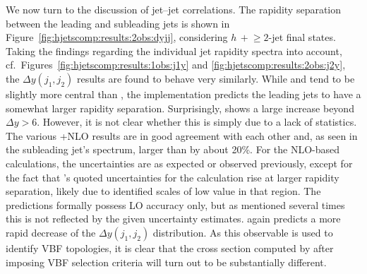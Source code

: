 We now turn to the discussion of jet--jet correlations.
The rapidity separation between the leading and subleading jets is
shown in Figure~\ref{fig:hjetscomp:results:2obs:dyjj}, considering
$h\,+\!\ge\!2$-jet final states. Taking the findings regarding the
individual jet rapidity spectra into account,
cf.~Figures~\ref{fig:hjetscomp:results:1obs:j1y} and
\ref{fig:hjetscomp:results:2obs:j2y}, the $\Delta y(j_1,j_2)$ results
are found to behave very similarly. While \hjetscompSherpa \hjetscompNNLOPS and \hjetscompMGaMC
tend to be slightly more central than \hjetscompPowheg, the \hjetscompSherpa \hjetscompMEPSatNLO
implementation predicts the leading jets to have a somewhat larger
rapidity separation. Surprisingly, \hjetscompHerwig shows a large increase 
beyond $\Delta y>6$. However, it is not clear whether this is simply
due to a lack of statistics. The various \hjetscompGoSam{}+\hjetscompSherpa NLO results
are in good agreement with each other and, as seen in the subleading
jet's spectrum, larger than  \hjetscompPowheg  by about 20\%. For the NLO-based
calculations, the uncertainties are as expected or observed previously, except
for the fact that \hjetscompSherpa's quoted uncertainties for the \hjetscompMEPSatNLO
calculation rise at larger rapidity separation, likely due to
identified scales of low value in that region. The \hjetscompNNLOPS predictions
formally possess LO accuracy only, but as mentioned several times this is
not reflected by the given uncertainty estimates. \hjetscompHej again
predicts a more rapid decrease of the $\Delta y(j_1,j_2)$
distribution. As this observable is used to identify VBF topologies,
it is clear that the cross section computed by \hjetscompHej after imposing VBF
selection criteria will turn out to be substantially different.

